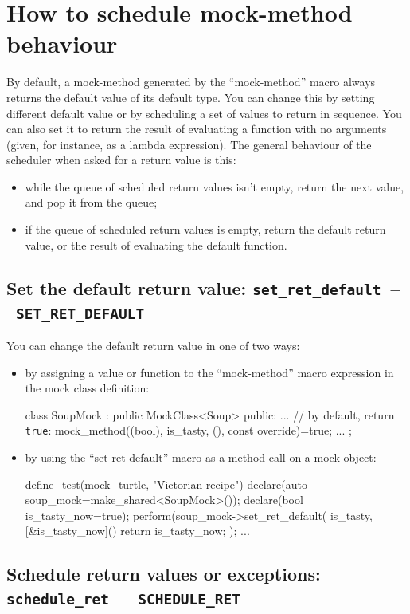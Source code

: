 \documentclass[twoside, a4paper, article]{memoir}
\newcommand*\testudocolor{\color{red!80!blue}}
\newcommand*\testudo[1]{\texttt{\testudocolor{}#1}}
\newcommand*\testudopair[2]{\testudo{#1}~--~\testudo{#2}}
\newcommand\subsectiontestudopair[3]{%
  \subsection[#1]{#1: \testudopair{#2}{#3}}}
\begin{document}
\section{How to schedule mock-method behaviour}
\label{sec:schedule-mock-method}

By default, a mock-method generated by the ``mock-method'' macro always returns
the default value of its default type.  You can change this by setting
different default value or by scheduling a set of values to return in sequence.
You can also set it to return the result of evaluating a function with no
arguments (given, for instance, as a lambda expression).  The general behaviour
of the scheduler when asked for a return value is this:
\begin{itemize}
\item while the queue of scheduled return values isn't empty, return the next
  value, and pop it from the queue;
\item if the queue of scheduled return values is empty, return the default
  return value, or the result of evaluating the default function.
\end{itemize}

\subsectiontestudopair{Set the default return value}%
  {set\_ret\_default}{SET\_RET\_DEFAULT}

You can change the default return value in one of two ways:
\begin{itemize}
\item by assigning a value or function to the ``mock-method'' macro expression
  in the mock class definition:
\begin{cpplisting}
class SoupMock
  : public MockClass<Soup> {
public:
  ...
  // by default, return \texttt{true}:
  mock_method((bool), is_tasty, (), const override)=true;
  ...
};
\end{cpplisting}
\item by using the ``set-ret-default'' macro as a method call on a mock object:
\begin{cpplisting}
define_test(mock_turtle, "Victorian recipe") {
  declare(auto soup_mock=make_shared<SoupMock>());
  declare(bool is_tasty_now=true);
  perform(soup_mock->set_ret_default(
            is_tasty,
            [&is_tasty_now]() { return is_tasty_now; });
  ...
}
\end{cpplisting}
\end{itemize}

\subsectiontestudopair{Schedule return values or exceptions}%
  {schedule\_ret}{SCHEDULE\_RET}
\end{document}
